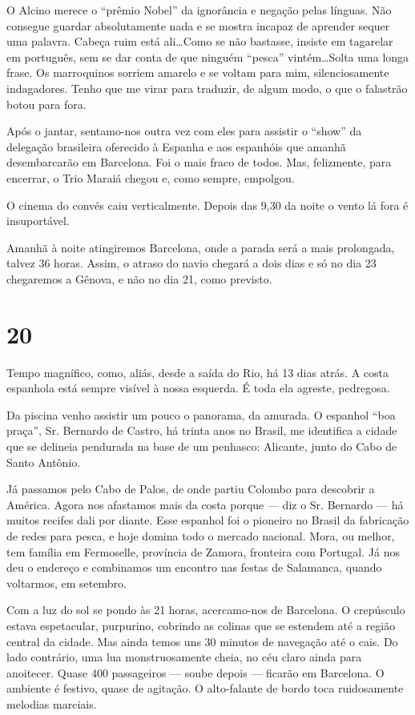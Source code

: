 O Alcino merece o ``prêmio Nobel'' da ignorância e negação pelas línguas. Não consegue guardar absolutamente nada e se mostra incapaz de aprender sequer uma palavra. Cabeça ruim está ali\ldots Como se não bastasse, insiste em tagarelar em português, sem se dar conta de que ninguém ``pesca'' vintém\ldots Solta uma longa frase. Os marroquinos sorriem amarelo e se voltam para mim, silenciosamente indagadores. Tenho que me virar para traduzir, de algum modo, o que o falastrão botou para fora.

Após o jantar, sentamo-nos outra vez com eles para assistir o ``show'' da delegação brasileira oferecido à Espanha e aos espanhóis que amanhã desembarcarão em Barcelona. Foi o mais fraco de todos. Mas, felizmente, para encerrar, o Trio Maraiá chegou e, como sempre, empolgou.

O cinema do convés caiu verticalmente. Depois das 9,30 da noite o vento lá fora é insuportável.

Amanhã à noite atingiremos Barcelona, onde a parada será a mais prolongada, talvez 36 horas. Assim, o atraso do navio chegará a dois dias e só no dia 23 chegaremos a Gênova, e não no dia 21, como previsto.

\section*{20 \adfflatleafright {}}

Tempo magnífico, como, aliás, desde a saída do Rio, há 13 dias atrás. A costa espanhola está sempre visível à nossa esquerda. É toda ela agreste, pedregosa.

Da piscina venho assistir um pouco o panorama, da amurada. O espanhol ``boa praça'', Sr. Bernardo de Castro, há trinta anos no Brasil, me identifica a cidade que se delineia pendurada na base de um penhasco: Alicante, junto do Cabo de Santo Antônio.

Já passamos pelo Cabo de Palos, de onde partiu Colombo para descobrir a América. Agora nos afastamos mais da costa porque --- diz o Sr. Bernardo --- há muitos recifes dali por diante. Esse espanhol foi o pioneiro no Brasil da fabricação de redes para pesca, e hoje domina todo o mercado nacional. Mora, ou melhor, tem família em Fermoselle, província de Zamora, fronteira com Portugal. Já nos deu o endereço e combinamos um encontro nas festas de Salamanca, quando voltarmos, em setembro.

Com a luz do sol se pondo às 21 horas, acercamo-nos de Barcelona. O crepúsculo estava espetacular, purpurino, cobrindo as colinas que se estendem até a região central da cidade. Mas ainda temos uns 30 minutos de navegação até o cais. Do lado contrário, uma lua monstruosamente cheia, no céu claro ainda para anoitecer. Quase 400 passageiros --- soube depois --- ficarão em Barcelona. O ambiente é festivo, quase de agitação. O alto-falante de bordo toca ruidosamente melodias marciais.


